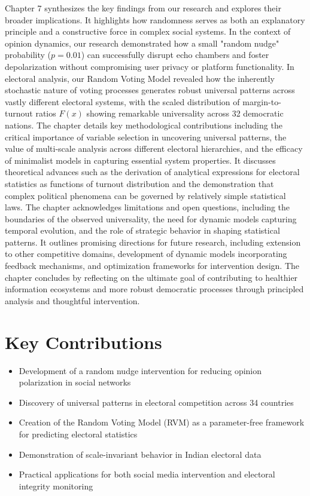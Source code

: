 Chapter 7 synthesizes the key findings from our research and explores their broader implications. It highlights how randomness serves as both an explanatory principle and a constructive force in complex social systems. In the context of opinion dynamics, our research demonstrated how a small "random nudge" probability ($p = 0.01$) can successfully disrupt echo chambers and foster depolarization without compromising user privacy or platform functionality. In electoral analysis, our Random Voting Model revealed how the inherently stochastic nature of voting processes generates robust universal patterns across vastly different electoral systems, with the scaled distribution of margin-to-turnout ratios $F(x)$ showing remarkable universality across 32 democratic nations. The chapter details key methodological contributions including the critical importance of variable selection in uncovering universal patterns, the value of multi-scale analysis across different electoral hierarchies, and the efficacy of minimalist models in capturing essential system properties. It discusses theoretical advances such as the derivation of analytical expressions for electoral statistics as functions of turnout distribution and the demonstration that complex political phenomena can be governed by relatively simple statistical laws. The chapter acknowledges limitations and open questions, including the boundaries of the observed universality, the need for dynamic models capturing temporal evolution, and the role of strategic behavior in shaping statistical patterns. It outlines promising directions for future research, including extension to other competitive domains, development of dynamic models incorporating feedback mechanisms, and optimization frameworks for intervention design. The chapter concludes by reflecting on the ultimate goal of contributing to healthier information ecosystems and more robust democratic processes through principled analysis and thoughtful intervention.

\section*{Key Contributions}

\begin{itemize}
\item Development of a random nudge intervention for reducing opinion polarization in social networks
\item Discovery of universal patterns in electoral competition across 34 countries
\item Creation of the Random Voting Model (RVM) as a parameter-free framework for predicting electoral statistics
\item Demonstration of scale-invariant behavior in Indian electoral data
\item Practical applications for both social media intervention and electoral integrity monitoring
\end{itemize}

